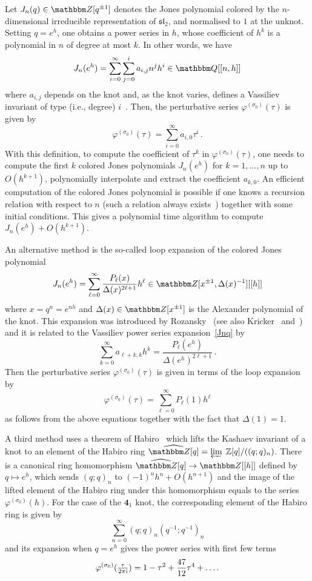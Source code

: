 \documentclass[12pt,reqno]{amsart}
\theoremstyle{definition}
\def\BZ{\mathbbm Z}
\def\BQ{\mathbbm Q}
\def\s{\sigma}
\def\be{\begin{equation}}
\def\ee{\end{equation}}
\def\Z{\Bbb Z}
\def\ri{\mathrm{i}}
\def\ri{{\rm i}}
\def\md{\mathbf}
\newcommand{\knot}[1]{\md{#1}}
\begin{document}
Let $J_n(q) \in \BZ[q^{\pm 1}]$ denotes the Jones polynomial colored by the
$n$-dimensional irreducible representation of $\mathfrak{sl}_2$, and normalised to $1$
at the unknot. Setting $q=e^h$, one obtains a power series in $h$, whose coefficient
of $h^k$ is a polynomial in $n$ of degree at most $k$. In other words, we have
\be
\label{Jnq}
J_n(e^h) = \sum_{i=0}^\infty \sum_{j=0}^i a_{i,j} n^j h^i \in \BQ[[n,h]]
\ee
where $a_{i,j}$ depends on the knot and, as the knot varies, defines a Vassiliev
invariant of type (i.e., degree) $i$~\cite{Bar-Natan}. Then, the perturbative series
$\varphi^{(\s_0)}(\tau)$ is given by 
\be
\label{phi0h}
\varphi^{(\s_0)}(\tau) = \sum_{i=0}^\infty a_{i,0} \tau^i \,.
\ee
With this definition, to compute the coefficient of $\tau^k$ in $\varphi^{(\s_0)}(\tau)$,
one needs to compute the first $k$ colored Jones polynomials $J_n(e^h)$ for
$k =1, \dots, n$ up to $O(h^{k+1})$, polynomially interpolate and extract the
coefficient $a_{k,0}$. An efficient computation of the colored Jones polynomial
is possible if one knows a recursion relation with respect to $n$ (such a relation
always exists~\cite{GL}) together with some initial conditions. This gives a polynomial
time algorithm to compute $J_n(e^h)+O(h^{k+1})$.

An alternative method is the so-called
loop expansion of the colored Jones polynomial
\be
\label{Jnqloop}
J_n(e^h) = \sum_{\ell=0}^\infty \frac{P_\ell(x)}{\Delta(x)^{2\ell+1}} h^\ell \in
\BZ[x^{\pm 1}, \Delta(x)^{-1}][[h]]
\ee
where $x=q^n=e^{n h}$ and $\Delta(x) \in \BZ[x^{\pm 1}]$ is the Alexander polynomial
of the knot. This expansion was introduced by Rozansky~\cite{Rozansky:bureau} (see also
Kricker~\cite{Kricker} and~\cite{GK:noncommutative}) and it is related to the
Vassiliev power series expansion~\eqref{Jnq} by 
\be
\label{Jnqresum}
\sum_{k=0}^\infty a_{\ell+k,k} h^k= \frac{P_\ell(e^h)}{\Delta(e^h)^{2\ell+1}} \,.
\ee
Then the perturbative series $\varphi^{(\s_0)}(\tau)$ is given in terms of the
loop expansion by
%
\be
\label{phi0hloop}
\varphi^{(\s_0)}(\tau) = \sum_{\ell=0}^\infty P_\ell(1) h^\ell 
\ee
%
as follows from the above equations together with the fact that $\Delta(1)=1$.

A third method uses a theorem of Habiro~\cite{Habiro:sl2, Habiro:WRT} which lifts
the Kashaev invariant of a knot to an element of the Habiro ring
$\widehat{\BZ[q]} = \varprojlim \;\Z[q]/((q;q)_n)$. There is a canonical
ring homomorphism $\widehat{\BZ[q]} \to \BZ[[h]]$ defined by $q \mapsto e^h$,
which sends $(q;q)_n$ to $(-1)^n h^n + O(h^{n+1})$ and the image of the lifted
element of the Habiro ring under this homomorphism equals to the series
$\varphi^{(\s_0)}(h)$. For the case of the $\knot{4}_1$ knot, the corresponding
element of the Habiro ring is given by
\be
\label{hab41}
\sum_{n=0}^\infty (q;q)_n (q^{-1};q^{-1})_n 
\ee
and its expansion when $q=e^h$ gives the power series with first few terms 
\begin{equation}
  \varphi^{(\s_0)}%
  (\tfrac{\tau}{2\pi\ri})=
  1-\tau^2+\frac{47}{12}\tau^4+\ldots.
\end{equation}
\end{document}

